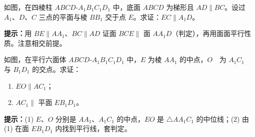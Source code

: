 \documentclass{exam-zh}
\begin{document}

\begin{problem}[points=10]
  \noindent
  \begin{minipage}[t]{\dimexpr\linewidth-60mm-6mm\relax}
    \vspace{0pt}
    如图，在四棱柱 $ABCD$-$A_{1}B_{1}C_{1}D_{1}$ 中，底面 $ABCD$ 为梯形且 $AD\parallel BC$。设过 $A_{1}$、$D$、$C$ 三点的平面与棱 $BB_{1}$ 交于点 $E$。求证：$EC\parallel A_{1}D$。

    \begin{hintbox}
\textbf{提示：}用 $BE\parallel AA_{1}$、$BC\parallel AD$ 证面 $BCE\parallel$ 面 $AA_{1}D$（判定），再用面面平行性质。注意相交前提。\end{hintbox}

  \end{minipage}\hfill
  \begin{diagramcoltikz}{60mm}{证面 $BCE\parallel$ 面 $AA_{1}D$，两面被面 $A_{1}DCE$ 截出两条平行交线。}
  }
  \end{diagramcoltikz}
  \par\medskip
  \answerarea[75mm]
\end{problem}



\begin{problem}[points=10]
  \noindent
  \begin{minipage}[t]{\dimexpr\linewidth-60mm-6mm\relax}
    \vspace{0pt}
    如图，在平行六面体 $ABCD$-$A_{1}B_{1}C_{1}D_{1}$ 中，$E$ 为棱 $AA_{1}$ 的中点，$O$\ \ 为 $A_{1}C_{1}$ 与 $B_{1}D_{1}$ 的交点。求证：
\begin{enumerate}[label=(\arabic*)]
\ \  \item $EO\parallel AC_{1}$；
  \item $AC_{1}\parallel$ 平面 $EB_{1}D_{1}$。
\ \end{enumerate}

    \begin{hintbox}
\textbf{提示：}(1) $E$、$O$ 分别是 $AA_{1}$、$A_{1}C_{1}$ 的中点，$EO$ 是 $\triangle AA_{1}C_{1}$ 的中位线；(2) 由 (1) 在面 $EB_{1}D_{1}$ 内找到平行线，套判定。\end{hintbox}

  \end{minipage}\hfill
  \begin{diagramcoltikz}{60mm}{$O$ 是上底面对角线交点，$EO$ 中位线平行 $AC_{1}$。}
  }
  \end{diagramcoltikz}
  \par\medskip
  \answerarea[70mm]
\end{problem}
\end{document}
